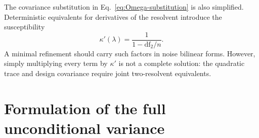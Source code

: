\documentclass[11pt]{article}
\begin{document}
The covariance substitution in Eq.~\eqref{eq:Omega-substitution} is also
simplified.  Deterministic equivalents for derivatives of the resolvent
introduce the susceptibility
\begin{equation}
  \kappa'(\lambda)
  =
  \frac{1}{
  1-\mathrm{df}_2/n
  }.
  \label{eq:kappa-prime}
\end{equation}
A minimal refinement should carry such factors in noise bilinear forms.
However, simply multiplying every term by \(\kappa'\) is not a complete
solution: the quadratic trace and design covariance require joint
two-resolvent equivalents.

\section{Formulation of the full unconditional variance}
\label{sec:full-varR}
\end{document}
